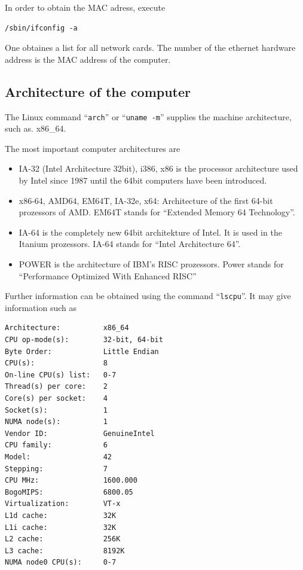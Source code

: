 \documentclass[a4paper,10pt]{report}
\newcommand{\mytt}[1]{{\tt #1}}
\begin{document}
In order to obtain the  MAC adress, execute
\begin{verbatim}
/sbin/ifconfig -a
\end{verbatim}
One obtaines a list for all network cards. The number of the ethernet
hardware address is the MAC address of the computer.

\subsection{Architecture of the computer}
The Linux command ``\mytt{arch}'' or ``\mytt{uname -m}'' supplies the
machine architecture, such as. x86\_64.

The most important computer architectures are
\begin{itemize}
\item IA-32 (Intel Architecture 32bit), i386, x86 is the processor
architecture used by Intel since 1987 until the 64bit computers have
been introduced.
\item x86-64, AMD64, EM64T, IA-32e, x64:  Architecture of the first 64-bit
prozessors of  AMD. EM64T stands for ``Extended Memory 64 Technology''.
\item IA-64 is the completely new 64bit architekture of Intel. It is
used in the Itanium prozessors. IA-64 stands for ``Intel Architecture
64''.
\item POWER is the architecture of IBM's RISC prozessors.
Power stands for ``Performance Optimized With Enhanced RISC''
\end{itemize}

Further information can be obtained using the command
``\mytt{lscpu}''. It may give information such as
\begin{verbatim}
Architecture:          x86_64
CPU op-mode(s):        32-bit, 64-bit
Byte Order:            Little Endian
CPU(s):                8
On-line CPU(s) list:   0-7
Thread(s) per core:    2
Core(s) per socket:    4
Socket(s):             1
NUMA node(s):          1
Vendor ID:             GenuineIntel
CPU family:            6
Model:                 42
Stepping:              7
CPU MHz:               1600.000
BogoMIPS:              6800.05
Virtualization:        VT-x
L1d cache:             32K
L1i cache:             32K
L2 cache:              256K
L3 cache:              8192K
NUMA node0 CPU(s):     0-7
\end{verbatim}
\end{document}
